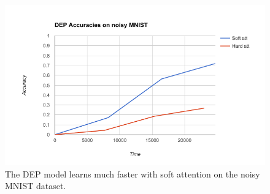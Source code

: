 
\begin{figure}
    \centering
    \includegraphics[scale=0.6]{resources/soft_vs_hard.png}
    \caption{The DEP model learns much faster with soft attention on the noisy MNIST dataset.}
    \label{fig:attention_mnist_graph}
\end{figure}
